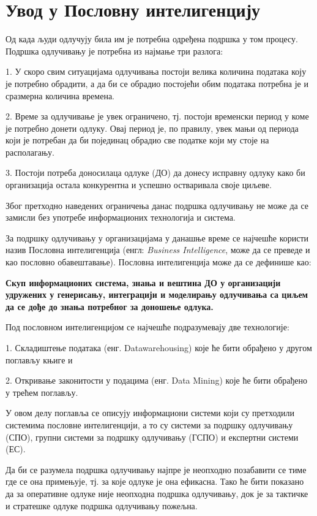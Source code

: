 
\chapter{Увод у Пословну интелигенцију}
\label{ch:uvod}
Од када људи одлучују била им је потребна одређена подршка у том процесу. Подршка одлучивању је потребна из најмање три разлога:

1. У скоро свим ситуацијама одлучивања постоји велика количина података коју је потребно обрадити, а да би се обрадио постојећи обим података потребна је и сразмерна количина времена.

2. Време за одлучивање је увек ограничено, тј. постоји временски период у коме је потребно донети одлуку. Овај период је, по правилу, увек мањи од периода који је потребан да би појединац обрадио све податке који му стоје на располагању.

3. Постоји потреба доносилаца одлуке (ДО) да донесу исправну одлуку како би организација остала конкурентна и успешно остваривала своје циљеве.

Због претходно наведених ограничења данас подршка одлучивању не може да се замисли без употребе информационих технологија и система.

За подршку одлучивању у организацијама у данашње време се најчешће користи назив Пословна интелигенција (енгл: \textit{Business Intelligence}, може да се преведе и као пословно обавештавање). Пословна интелигенција може да се дефинише као:

\textbf{Скуп информационих система, знања и вештина ДО у организацији удружених у генерисању, интеграцији и моделирању одлучивања са циљем да се дође до знања потребног за доношење одлука.}

Под пословном интелигенцијом се најчешће подразумевају две технологије:

1. Складиштење података (енг. Datawarehousing) које ће бити обрађено у другом поглављу књиге и

2. Откривање законитости у подацима (енг. Data Mining) које ће бити обрађено у трећем поглављу.

У овом делу поглавља се описују информациони системи који су претходили системима пословне интелигенцији, а то су системи за подршку одлучивању (СПО), групни системи за подршку одлучивању (ГСПО) и експертни системи (ЕС).

Да би се разумела подршка одлучивању најпре је неопходно позабавити се тиме где се она примењује, тј. за које одлуке је она ефикасна. Тако ће бити показано да за оперативне одлуке није неопходна подршка одлучивању, док је за тактичке и стратешке одлуке подршка одлучивању пожељна.

